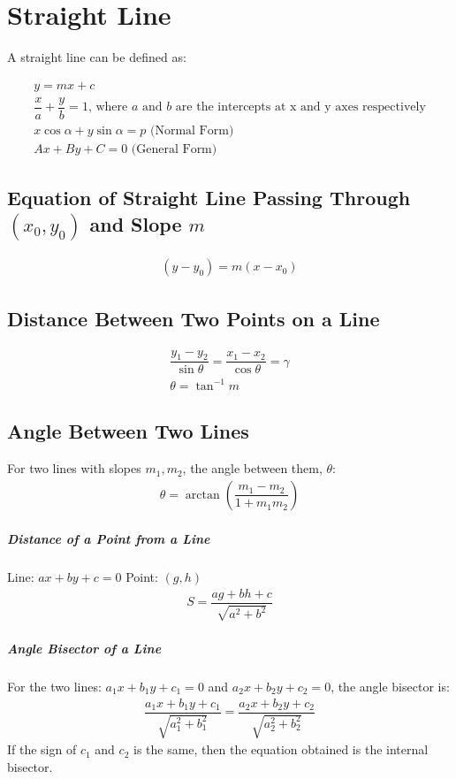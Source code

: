 \documentclass[../main.tex]{subfile}
\begin{document}
	\chapter{Straight Line}
	A straight line can be defined as:
	
	\begin{align}
		y=mx+c\\
		\dfrac{x}{a}+\dfrac{y}{b}=1\text{, where }a\text{ and }b\text{ are the intercepts at x and y axes respectively}\\
		x\cos\alpha + y\sin\alpha = p\text{ (Normal Form)}\\
		Ax+By+C=0\text{ (General Form)}
	\end{align}
	
	\section{Equation of Straight Line Passing Through $(x_0,y_0)$ and Slope $m$}
	\begin{align}
		(y-y_0)=m(x-x_0)
	\end{align}
	
	\section{Distance Between Two Points on a Line}
	\begin{align}
		\dfrac{y_1-y_2}{\sin\theta}=\dfrac{x_1-x_2}{\cos\theta}=\gamma\\
		\theta=\tan^{-1}m
	\end{align}
	
	\section{Angle Between Two Lines}
	For two lines with slopes $m_1, m_2$, the angle between them, $\theta$:
	\begin{align}
		\theta=\arctan\left(\dfrac{m_1-m_2}{1+m_1m_2}\right)
	\end{align}
	
	\paragraph{Distance of a Point from a Line\newline}
	Line: $ax+by+c=0$
	Point: $(g,h)$
	\begin{align}
		S=\dfrac{ag+bh+c}{\sqrt{a^2+b^2}}
	\end{align}
	
	\paragraph{Angle Bisector of a Line}
	For the two lines: $a_1x+b_1y+c_1=0$ and $a_2x+b_2y+c_2=0$, the angle bisector is:
	\begin{align}
		\dfrac{a_1x+b_1y+c_1}{\sqrt{a_1^2+b_1^2}}=\dfrac{a_2x+b_2y+c_2}{\sqrt{a_2^2+b_2^2}}
	\end{align}
	If the sign of $c_1$ and $c_2$ is the same, then the equation obtained is the internal bisector.
	
\end{document}
